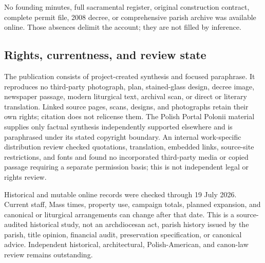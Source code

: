 No founding minutes, full sacramental register, original construction contract, complete permit file, 2008 decree, or comprehensive parish archive was available online. Those absences delimit the account; they are not filled by inference.

\subsection{Rights, currentness, and review state}

The publication consists of project-created synthesis and focused paraphrase. It reproduces no third-party photograph, plan, stained-glass design, decree image, newspaper passage, modern liturgical text, archival scan, or direct or literary translation. Linked source pages, scans, designs, and photographs retain their own rights; citation does not relicense them. The Polish Portal Polonii material supplies only factual synthesis independently supported elsewhere and is paraphrased under its stated copyright boundary. An internal work-specific distribution review checked quotations, translation, embedded links, source-site restrictions, and fonts and found no incorporated third-party media or copied passage requiring a separate permission basis; this is not independent legal or rights review.

Historical and mutable online records were checked through 19 July 2026. Current staff, Mass times, property use, campaign totals, planned expansion, and canonical or liturgical arrangements can change after that date. This is a source-audited historical study, not an archdiocesan act, parish history issued by the parish, title opinion, financial audit, preservation specification, or canonical advice. Independent historical, architectural, Polish-American, and canon-law review remains outstanding.
